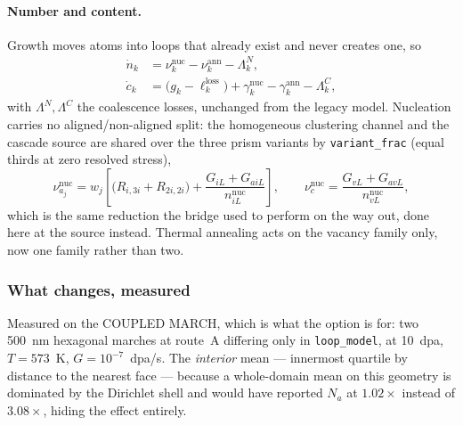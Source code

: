 \documentclass[11pt]{article}
\newcommand{\code}[1]{\texttt{\small #1}}
\begin{document}
\paragraph{Number and content.} Growth moves atoms into loops that already
exist and never creates one, so
%
\begin{align}
  \dot n_k &= \nu^{\mathrm{nuc}}_k - \nu^{\mathrm{ann}}_k - \Lambda^{N}_k ,
  \label{eq:ndot}\\
  \dot c_k &= \bigl(g_k - \ell_k^{\text{loss}}\bigr)
              + \gamma^{\mathrm{nuc}}_k - \gamma^{\mathrm{ann}}_k
              - \Lambda^{C}_k ,
  \label{eq:cdot}
\end{align}
%
with $\Lambda^{N},\Lambda^{C}$ the coalescence losses, unchanged from the
legacy model. Nucleation carries no aligned/non-aligned split: the homogeneous
clustering channel and the cascade source are shared over the three prism
variants by \code{variant\_frac} (equal thirds at zero resolved stress),
%
\begin{equation}
  \nu^{\mathrm{nuc}}_{a_j} = w_j\!\left[
      \bigl(R_{i,3i} + R_{2i,2i}\bigr) +
      \frac{G_{iL} + G_{aiL}}{n^{\mathrm{nuc}}_{iL}} \right],
  \qquad
  \nu^{\mathrm{nuc}}_{c} = \frac{G_{vL} + G_{avL}}{n^{\mathrm{nuc}}_{vL}} ,
\end{equation}
%
which is the same reduction the bridge used to perform on the way out, done
here at the source instead. Thermal annealing acts on the vacancy family only,
now one family rather than two.

\subsubsection{What changes, measured}

Measured on the COUPLED MARCH, which is what the option is for: two 500~nm
hexagonal marches at route~A differing only in \code{loop\_model}, at
10~\textrm{dpa}, $T=573$~K, $G=10^{-7}$~\textrm{dpa}/s. The \emph{interior}
mean --- innermost quartile by distance to the nearest face --- because a
whole-domain mean on this geometry is dominated by the Dirichlet shell and would
have reported $N_a$ at $1.02\times$ instead of $3.08\times$, hiding the effect
entirely.
\end{document}
